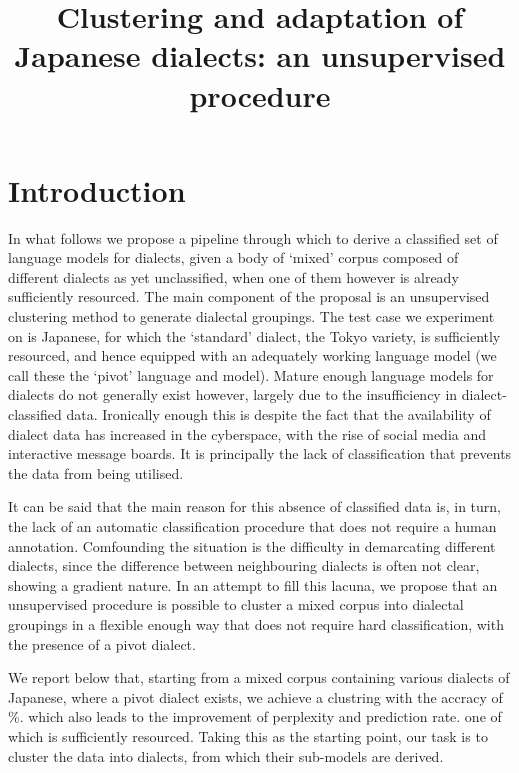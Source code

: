 \documentclass{article}
\title{Clustering and adaptation of Japanese dialects: an unsupervised procedure}
\begin{document}
\maketitle

\begin{abstract}
  
\end{abstract}

\section{Introduction}

In what follows we propose a pipeline through which to derive a classified set of language models for dialects, given a body of `mixed' corpus composed of different dialects as yet unclassified, when one of them however is already sufficiently resourced. The main component of the proposal is an unsupervised clustering method to generate dialectal groupings. The test case we experiment on is Japanese, for which the `standard' dialect, the Tokyo variety, is sufficiently resourced, and hence equipped with an adequately working language model (we call these the `pivot' language and model).  Mature enough language models for dialects do not generally exist however, largely due to the insufficiency in dialect-classified data. Ironically enough this is despite the fact that the availability of dialect data has increased in the cyberspace, with the rise of social media and interactive message boards. It is principally the lack of classification that prevents the data from being utilised.

It can be said that the main reason for this absence of classified data is, in turn, the lack of an automatic classification procedure that does not require a human annotation. Comfounding the situation is the difficulty in demarcating different dialects, since the difference between neighbouring dialects is often not clear, showing a gradient nature. In an attempt to fill this lacuna, we propose that an unsupervised procedure is possible to cluster a mixed corpus into dialectal groupings in a flexible enough way that does not require hard classification, with the presence of a pivot dialect.

We report below that, starting from a mixed corpus containing various dialects of Japanese, where a pivot dialect exists, we achieve a clustring with  the accracy of  \%.  which also leads to the improvement of perplexity and prediction rate. one of which is sufficiently resourced. Taking this as the starting point, our task is to cluster the data into dialects, from which their sub-models are derived.
\end{document}
